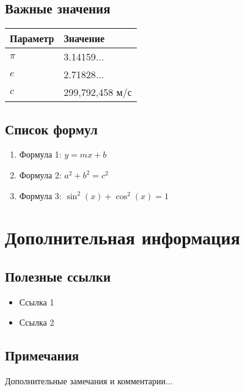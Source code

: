 \documentclass[10pt,landscape,a4paper]{article}
\begin{document}
\begin{multicols}{2}
\subsection{Важные значения}
\begin{center}
\begin{tabular}{@{}ll@{}}
\toprule
Параметр & Значение \\
\midrule
$\pi$ & 3.14159... \\
$e$ & 2.71828... \\
$c$ & 299,792,458 м/с \\
\bottomrule
\end{tabular}
\end{center}

\subsection{Список формул}
\begin{enumerate}
    \item Формула 1: $y = mx + b$
    \item Формула 2: $a^2 + b^2 = c^2$
    \item Формула 3: $\sin^2(x) + \cos^2(x) = 1$
\end{enumerate}

\section{Дополнительная информация}

\subsection{Полезные ссылки}
\begin{itemize}
    \item Ссылка 1
    \item Ссылка 2
\end{itemize}

\subsection{Примечания}
Дополнительные замечания и комментарии...

\end{multicols}
\end{document}
